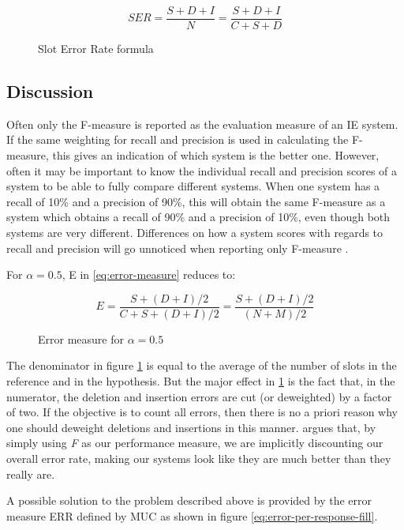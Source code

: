\begin{figure}[H]
\begin{displaymath}
	SER = \frac{S+D+I}{N} = \frac{S+D+I}{C+S+D}
\end{displaymath}
\caption{Slot Error Rate formula}
\end{figure}

\subsection{Discussion}
Often only the F-measure is reported as the evaluation measure of an IE system. If the same weighting for recall and precision is used in calculating the F-measure, this gives an indication of which system is the better one. However, often it may be important to know the individual recall and precision scores of a system to be able to fully compare different systems. When one system has a recall of 10\% and a precision of 90\%, this will obtain the same F-measure as a system which obtains a recall of 90\% and a precision of 10\%, even though both systems are very different. Differences on how a system scores with regards to recall and precision will go unnoticed when reporting only F-measure \cite{Sitter:2004}.

For $\alpha = 0.5$, E in \ref{eq:error-measure} reduces to:

\begin{figure}[H]
\begin{displaymath}
	E = \frac{S + (D+I)/2}{C+S+(D+I)/2} = \frac{S + (D+I)/2}{(N+M)/2}
\end{displaymath}
\caption{Error measure for $\alpha = 0.5$}
\label{eq:error-measure2}
\end{figure}

The denominator in figure \ref{eq:error-measure2} is equal to the average of the number of slots in the reference and in the hypothesis. But the major effect in \ref{eq:error-measure2} is the fact that, in the numerator, the deletion and insertion errors are cut (or deweighted) by a factor of two. If the objective is to count all errors, then there is no a priori reason why one should deweight deletions and insertions in this manner.  \cite{Makhoul:1999} argues that, by simply using \textit{F} as our performance measure, we are implicitly discounting our overall error rate, making our systems look like they are much better than they really are.

A possible solution to the problem described above is provided by the error measure ERR defined by MUC \cite{Chinchor:1995}\cite{Makhoul:1999} as shown in figure \ref{eq:error-per-response-fill}.


